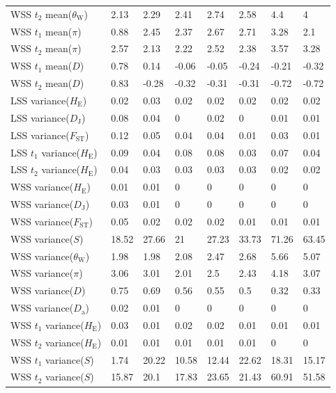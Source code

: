 \documentclass[a4paper, 12pt]{article}
\begin{document}
\begin{tiny}
\begin{longtable}{p{3.0cm}p{1.0cm}p{1.0cm}p{1.0cm}p{1.0cm}p{1.0cm}p{1.0cm}p{1.0cm}}
WSS $t_2$ mean($\theta_{\mathrm{W}}$) & 2.13 & 2.29 & 2.41 & 2.74 & 2.58 & 4.4 & 4 \\
WSS $t_1$ mean($\pi$) & 0.88 & 2.45 & 2.37 & 2.67 & 2.71 & 3.28 & 2.1 \\
WSS $t_2$ mean($\pi$) & 2.57 & 2.13 & 2.22 & 2.52 & 2.38 & 3.57 & 3.28 \\
WSS $t_1$ mean($D$) & 0.78 & 0.14 & -0.06 & -0.05 & -0.24 & -0.21 & -0.32 \\
WSS $t_2$ mean($D$) & 0.83 & -0.28 & -0.32 & -0.31 & -0.31 & -0.72 & -0.72 \\
LSS variance($H_{\mathrm{E}}$) & 0.02 & 0.03 & 0.02 & 0.02 & 0.02 & 0.02 & 0.02 \\
LSS variance($D_{\mathrm{J}}$) & 0.08 & 0.04 & 0 & 0.02 & 0 & 0.01 & 0.01 \\
LSS variance($F_{\mathrm{ST}}$) & 0.12 & 0.05 & 0.04 & 0.04 & 0.01 & 0.03 & 0.01 \\
LSS $t_1$ variance($H_{\mathrm{E}}$) & 0.09 & 0.04 & 0.08 & 0.08 & 0.03 & 0.07 & 0.04 \\
LSS $t_2$ variance($H_{\mathrm{E}}$) & 0.04 & 0.03 & 0.03 & 0.03 & 0.03 & 0.02 & 0.02 \\
WSS variance($H_{\mathrm{E}}$) & 0.01 & 0.01 & 0 & 0 & 0 & 0 & 0 \\
WSS variance($D_{\mathrm{J}}$) & 0.03 & 0.01 & 0 & 0 & 0 & 0 & 0 \\
WSS variance($F_{\mathrm{ST}}$) & 0.05 & 0.02 & 0.02 & 0.02 & 0.01 & 0.01 & 0.01 \\
WSS variance($S$) & 18.52 & 27.66 & 21 & 27.23 & 33.73 & 71.26 & 63.45 \\
WSS variance($\theta_{\mathrm{W}}$) & 1.98 & 1.98 & 2.08 & 2.47 & 2.68 & 5.66 & 5.07 \\
WSS variance($\pi$) & 3.06 & 3.01 & 2.01 & 2.5 & 2.43 & 4.18 & 3.07 \\
WSS variance($D$) & 0.75 & 0.69 & 0.56 & 0.55 & 0.5 & 0.32 & 0.33 \\
WSS variance($D_{\mathrm{a}}$) & 0.02 & 0.01 & 0 & 0 & 0 & 0 & 0 \\
WSS $t_1$ variance($H_{\mathrm{E}}$) & 0.03 & 0.01 & 0.02 & 0.02 & 0.01 & 0.01 & 0.01 \\
WSS $t_2$ variance($H_{\mathrm{E}}$) & 0.01 & 0.01 & 0.01 & 0.01 & 0.01 & 0 & 0 \\
WSS $t_1$ variance($S$) & 1.74 & 20.22 & 10.58 & 12.44 & 22.62 & 18.31 & 15.17 \\
WSS $t_2$ variance($S$) & 15.87 & 20.1 & 17.83 & 23.65 & 21.43 & 60.91 & 51.58 \\

\end{longtable}
\end{tiny}
\end{document}
